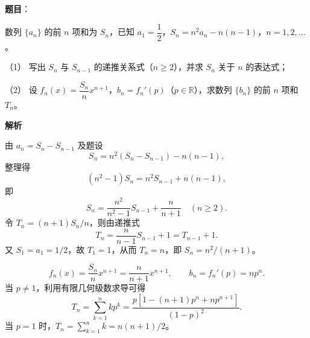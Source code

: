 \begin{answer}

\textbf{题目}：

数列 $\{a_n\}$ 的前 $n$ 项和为 $S_n$，已知 $a_1=\dfrac12$，$S_n=n^2a_n-n(n-1)$，$n=1,2,\ldots$。

（1） 写出 $S_n$ 与 $S_{n-1}$ 的递推关系式（$n\geqslant2$），并求 $S_n$ 关于 $n$ 的表达式；

（2） 设 $f_n(x)=\dfrac{S_n}{n}x^{n+1}$，$b_n=f_n'(p)$（$p\in\mathbb R$），求数列 $\{b_n\}$ 的前 $n$ 项和 $T_n$。

\textbf{解析}


由 $a_n=S_n-S_{n-1}$ 及题设
\nopagebreak[4]
\[
S_n=n^2(S_n-S_{n-1})-n(n-1),
\]
整理得
\nopagebreak[4]
\[
(n^2-1)S_n=n^2S_{n-1}+n(n-1),
\]
即
\nopagebreak[4]
\[
S_n=\frac{n^2}{n^2-1}S_{n-1}+\frac{n}{n+1}\quad(n\ge2).
\]
令 $T_n=(n+1)S_n/n$，则由递推式
\nopagebreak[4]
\[
T_n=\frac{n}{n-1}S_{n-1}+1=T_{n-1}+1.
\]
又 $S_1=a_1=1/2$，故 $T_1=1$，从而 $T_n=n$，即 $S_n=n^2/(n+1)$。


\nopagebreak[4]
\[
f_n(x)=\frac{S_n}{n}x^{n+1}=\frac{n}{n+1}x^{n+1},
\qquad b_n=f_n'(p)=np^n.
\]
当 $p\ne1$，利用有限几何级数求导可得
\nopagebreak[4]
\[
T_n=\sum_{k=1}^n kp^k
=\frac{p\left[1-(n+1)p^n+np^{n+1}\right]}{(1-p)^2}.
\]
当 $p=1$ 时，$T_n=\sum_{k=1}^n k=n(n+1)/2$。



\end{answer}

